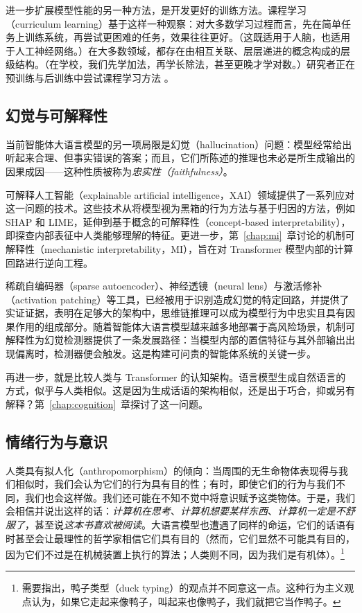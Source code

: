 进一步扩展模型性能的另一种方法，是开发更好的训练方法。课程学习（curriculum learning）基于这样一种观察：对大多数学习过程而言，先在简单任务上训练系统，再尝试更困难的任务，效果往往更好。（这既适用于人脑，也适用于人工神经网络。）在大多数领域，都存在由相互关联、层层递进的概念构成的层级结构。（在学校，我们先学加法，再学长除法，甚至更晚才学对数。）研究者正在预训练与后训练中尝试课程学习方法 \citep{chen2025self,elgaar2026curriculum}。

\subsection{幻觉与可解释性}
当前智能体大语言模型的另一项局限是幻觉（hallucination）问题：模型经常给出听起来合理、但事实错误的答案；而且，它们所陈述的推理也未必是所生成输出的因果成因——这种性质被称为\emph{忠实性（faithfulness）}。

可解释人工智能（explainable artificial intelligence，XAI）领域提供了一系列应对这一问题的技术。这些技术从将模型视为黑箱的行为方法与基于归因的方法，例如 SHAP 和 LIME，延伸到基于概念的可解释性（concept-based interpretability），即探查内部表征中人类能够理解的特征。更进一步，第~\ref{chap:mi}~章讨论的机制可解释性（mechanistic interpretability，MI），旨在对 Transformer 模型内部的计算回路进行逆向工程。

稀疏自编码器（sparse autoencoder）、神经透镜（neural lens）与激活修补（activation patching）等工具，已经被用于识别造成幻觉的特定回路，并提供了实证证据，表明在足够大的架构中，思维链推理可以成为模型行为中忠实且具有因果作用的组成部分。随着智能体大语言模型越来越多地部署于高风险场景，机制可解释性为幻觉检测器提供了一条发展路径：当模型内部的置信特征与其外部输出出现偏离时，检测器便会触发。这是构建可问责的智能体系统的关键一步。

再进一步，就是比较人类与 Transformer 的认知架构。语言模型生成自然语言的方式，似乎与人类相似。这是因为生成话语的架构相似，还是出于巧合，抑或另有解释？第~\ref{chap:cognition}~章探讨了这一问题。

\subsection{情绪行为与意识}
人类具有拟人化（anthropomorphism）的倾向：当周围的无生命物体表现得与我们相似时，我们会认为它们的行为具有目的性；有时，即使它们的行为与我们不同，我们也会这样做。我们还可能在不知不觉中将意识赋予这类物体。于是，我们会相信并说出这样的话：{\em 计算机在思考}、{\em 计算机想要某样东西}、{\em 计算机一定是不舒服了}，甚至说{\em 这本书喜欢被阅读}。大语言模型也遭遇了同样的命运，它们的话语有时甚至会让最理性的哲学家相信它们具有目的（然而，它们显然不可能具有目的，因为它们不过是在机械装置上执行的算法；人类则不同，因为我们是有机体）。\footnote{需要指出，鸭子类型（duck typing）的观点并不同意这一点。这种行为主义观点认为，如果它走起来像鸭子，叫起来也像鸭子，我们就把它当作鸭子。}

